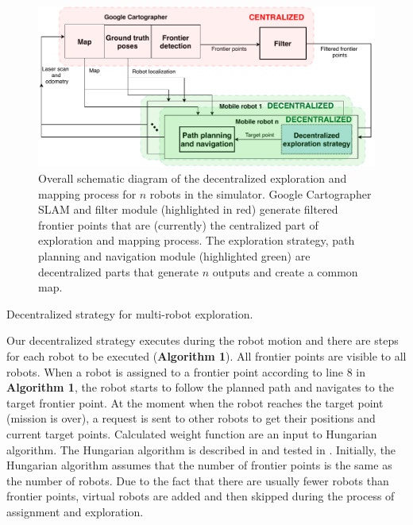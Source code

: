\begin{figure}[t!]
	\centering\includegraphics[width=1.0\columnwidth]{./pictures/diagram_exploration.pdf}
	\caption{Overall schematic diagram of the decentralized exploration and mapping process for $n$ robots in the simulator. Google Cartographer SLAM and filter module (highlighted in red) generate filtered frontier points that are (currently) the centralized part of exploration and mapping process. The exploration strategy, path planning and navigation module (highlighted green) are decentralized parts that generate $n$ outputs and create a common map.}
	\label{fig:exploration-strategy}
\end{figure}


\begin{algorithm}[b!]
	\label{algorithm1}
	\caption{Decentralized strategy for multi-robot exploration.}
\end{algorithm}


Our decentralized strategy executes during the robot motion and there are steps for each robot to be executed (\textbf{Algorithm 1}). All frontier points are visible to all robots.
When a robot is assigned to a frontier point according to line 8 in \textbf{Algorithm 1}, the robot starts to follow the planned path and navigates to the target frontier point. At the moment when the robot reaches the target point (mission is over), a request is sent to other robots to get their positions and current target points. Calculated weight function are an input to Hungarian algorithm. 
The Hungarian algorithm is described in \cite{Kuhn1955} and tested in \cite{Kulich2015}. Initially, the Hungarian algorithm assumes that the number of frontier points is the same as the number of robots. Due to the fact that there are usually fewer robots than frontier points, virtual robots are added and then skipped during the process of assignment and exploration. 

